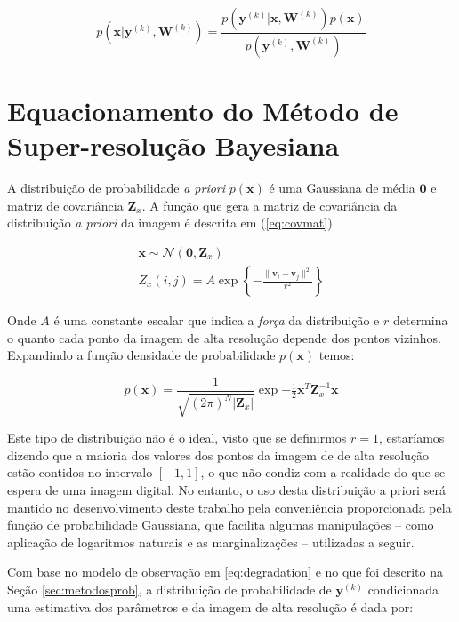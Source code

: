 \begin{equation}
	p(\mathbf{x} | \mathbf{y}^{(k)}, \mathbf{W}^{(k)}) = \frac{p(\mathbf{y}^{(k)} | \mathbf{x}, \mathbf{W}^{(k)}) p(\mathbf{x})}{p(\mathbf{y}^{(k)}, \mathbf{W}^{(k)})}
\end{equation}
\section{Equacionamento do Método de Super-resolução Bayesiana}
A distribuição de probabilidade \emph{a priori} $p(\mathbf{x})$ é uma Gaussiana de média $\mathbf{0}$ e matriz de covariância $\mathbf{Z}_x$. A função que gera a matriz de covariância da distribuição \emph{a priori} da imagem é descrita em (\ref{eq:covmat}).

\begin{gather}
	\mathbf{x} \sim \mathcal{N}(\mathbf{0}, \mathbf{Z}_x) \\ 
	\label{eq:covmat} Z_x(i,j) = A \exp \left\{ - \frac{\|\mathbf{v}_i - \mathbf{v}_j \|^2}{r^2} \right\}
\end{gather}

Onde $A$ é uma constante escalar que indica a \emph{força} da distribuição e $r$ determina o quanto cada ponto da imagem de alta resolução depende dos pontos vizinhos.
Expandindo a função densidade de probabilidade $p(\mathbf{x})$ temos:

\begin{equation}
	\label{eq:priordist}
	p(\mathbf{x}) = \frac{1}{\sqrt{(2\pi)^N |\mathbf{Z}_x|}}\exp{-\tfrac{1}{2} \mathbf{x}^T \mathbf{Z}^{-1}_x \mathbf{x}}
\end{equation}

Este tipo de distribuição não é o ideal, visto que se definirmos $r=1$, estaríamos dizendo que a maioria dos valores dos pontos da imagem de de alta resolução estão contidos no intervalo $[-1,1]$, o que não condiz com a realidade do que se espera de uma imagem digital.
No entanto, o uso desta distribuição a priori será mantido no desenvolvimento deste
trabalho pela conveniência proporcionada pela função de probabilidade Gaussiana, que
facilita algumas manipulações -- como aplicação de logaritmos naturais e as marginalizações --  utilizadas a seguir.

Com base no modelo de observação em \ref{eq:degradation} e no que foi descrito na Seção \ref{sec:metodosprob}, a distribuição de probabilidade de $\mathbf{y}^{(k)}$ condicionada uma estimativa dos parâmetros e da imagem de alta resolução é dada por:

